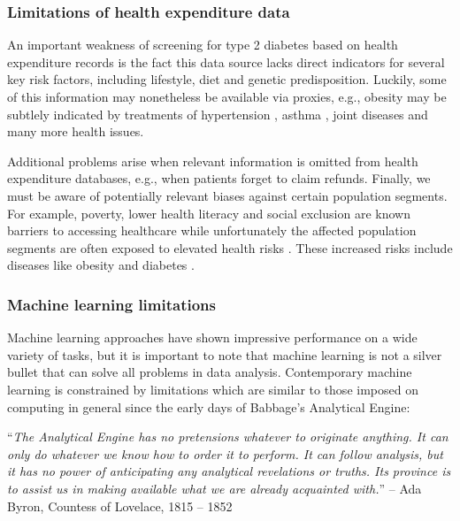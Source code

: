 \subsubsection{Limitations of health expenditure data}
An important weakness of screening for type 2 diabetes based on health expenditure records is the fact this data source lacks direct indicators for several key risk factors, including lifestyle, diet and genetic predisposition. Luckily, some of this information may nonetheless be available via proxies, e.g., obesity may be subtlely indicated by treatments of hypertension \citep{rahmouni2005obesity}, asthma \citep{sin2008obesity, sutherland2008association}, joint diseases \citep{symmons1997blood, cooper2000risk} and many more health issues.

Additional problems arise when relevant information is omitted from health expenditure databases, e.g., when patients forget to claim refunds. Finally, we must be aware of potentially relevant biases against certain population segments. For example, poverty, lower health literacy and social exclusion are known barriers to accessing healthcare \citep{qualityequality, pleis2009summary, world2010poverty, accesstohealth} while unfortunately the affected population segments are often exposed to elevated health risks \citep{qualityequality, schillinger2002association, marmot2008closing}. These increased risks include diseases like obesity and diabetes \citep{riste2001high, schillinger2002association}.

\subsubsection{Machine learning limitations}
Machine learning approaches have shown impressive performance on a wide variety of tasks, but it is important to note that machine learning is not a silver bullet that can solve all problems in data analysis. Contemporary machine learning is constrained by limitations which are similar to those imposed on computing in general since the early days of Babbage's Analytical Engine:

\begin{center}
\begin{minipage}{0.93\textwidth}
``\emph{The Analytical Engine has no pretensions whatever to originate anything. It can only do whatever we know how to order it to perform. It can follow analysis, but it has no power of anticipating any analytical revelations or truths. Its province is to assist us in making available what we are already acquainted with.}''
-- Ada Byron, Countess of Lovelace, 1815 -- 1852
\end{minipage}
\end{center}

